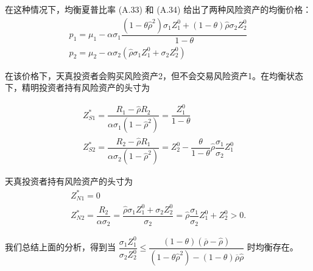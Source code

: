 \documentclass[10.0pt]{article}
\begin{document}

在这种情况下，均衡夏普比率 (A.33) 和 (A.34) 给出了两种风险资产的均衡价格：
\begin{eqnarray}
& p_1 = \mu_1 - \alpha \sigma_1 \dfrac{(1 - \theta {\hat \rho}^2) \sigma_1 Z_1^0 + (1 - \theta) {\hat \rho} \sigma_2 Z_2^0}{1 - \theta} & \\
& p_2 = \mu_2 - \alpha \sigma_2 ({\hat \rho} \sigma_1 Z_1^0 + \sigma_2 Z_2^0) &
\end{eqnarray}


在该价格下，天真投资者会购买风险资产2，但不会交易风险资产1。在均衡状态下，精明投资者持有风险资产的头寸为

\begin{eqnarray}
& Z_{S 1}^* = \dfrac{R_1 - \hat \rho R_2}{\alpha \sigma_1 (1 - \hat \rho^2)} = \dfrac{Z_1^0}{1 - \theta} & \\
& Z_{S 2}^* = \dfrac{R_2 - \hat \rho R_1}{\alpha \sigma_2 (1 - \hat \rho^2)} = Z_2^0 - \dfrac{\theta}{1 - \theta} {\hat \rho} \dfrac{\sigma_1}{\sigma_2} Z_1^0 &
\end{eqnarray}

天真投资者持有风险资产的头寸为
\begin{eqnarray}
& Z_{N 1}^* = 0 & \\
& Z_{N 2}^* = \dfrac{R_2}{\alpha \sigma_2} = \dfrac{{\hat \rho} \sigma_1 Z_1^0 + \sigma_2 Z_2^0}{\sigma_2} = {\hat \rho} \dfrac{\sigma_1}{\sigma_2} Z_1^0 + Z_2^0 > 0. &
\end{eqnarray}

我们总结上面的分析，得到当 $ \dfrac{\sigma_1 Z_1^0}{\sigma_2 Z_2^0} \leqslant \dfrac{(1 - \theta) (\overline{\rho} - {\hat \rho})}{(1 - \theta {\hat \rho}^2) - (1 - \theta) \overline{\rho} {\hat \rho}} $ 时均衡存在。
\end{document}
